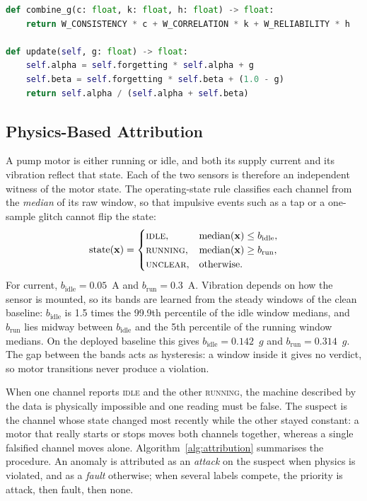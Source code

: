 \begin{lstlisting}[float=htbp, language=Python, caption={Beta-reputation state update (\texttt{edge/trust/beta.py})}, label={lst:beta}]
def combine_g(c: float, k: float, h: float) -> float:
    return W_CONSISTENCY * c + W_CORRELATION * k + W_RELIABILITY * h

def update(self, g: float) -> float:
    self.alpha = self.forgetting * self.alpha + g
    self.beta = self.forgetting * self.beta + (1.0 - g)
    return self.alpha / (self.alpha + self.beta)
\end{lstlisting}

\subsection{Physics-Based Attribution}
\label{sec:attribution}

A pump motor is either running or idle, and both its supply current and its vibration reflect that state. Each of the two sensors is therefore an independent witness of the motor state. The operating-state rule classifies each channel from the \emph{median} of its raw window, so that impulsive events such as a tap or a one-sample glitch cannot flip the state:
\begin{equation}
\mathrm{state}(\mathbf{x}) =
\begin{cases}
\textsc{idle}, & \mathrm{median}(\mathbf{x}) \leq b_{\mathrm{idle}}, \\
\textsc{running}, & \mathrm{median}(\mathbf{x}) \geq b_{\mathrm{run}}, \\
\textsc{unclear}, & \text{otherwise.}
\end{cases}
\end{equation}
For current, $b_{\mathrm{idle}} = 0.05$~A and $b_{\mathrm{run}} = 0.3$~A. Vibration depends on how the sensor is mounted, so its bands are learned from the steady windows of the clean baseline: $b_{\mathrm{idle}}$ is 1.5 times the 99.9th percentile of the idle window medians, and $b_{\mathrm{run}}$ lies midway between $b_{\mathrm{idle}}$ and the 5th percentile of the running window medians. On the deployed baseline this gives $b_{\mathrm{idle}} = 0.142$~$g$ and $b_{\mathrm{run}} = 0.314$~$g$. The gap between the bands acts as hysteresis: a window inside it gives no verdict, so motor transitions never produce a violation.

When one channel reports \textsc{idle} and the other \textsc{running}, the machine described by the data is physically impossible and one reading must be false. The suspect is the channel whose state changed most recently while the other stayed constant: a motor that really starts or stops moves both channels together, whereas a single falsified channel moves alone. Algorithm~\ref{alg:attribution} summarises the procedure. An anomaly is attributed as an \emph{attack} on the suspect when physics is violated, and as a \emph{fault} otherwise; when several labels compete, the priority is attack, then fault, then none.

